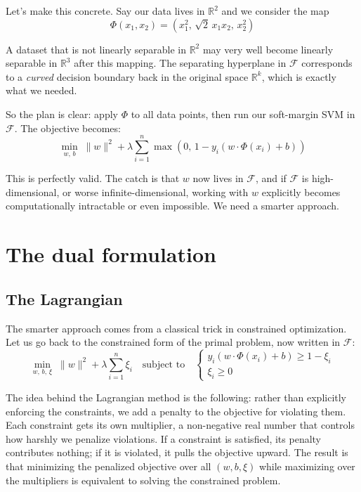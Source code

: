 \documentclass[12pt,a4paper]{article}
\begin{document}
Let's make this concrete. Say our data lives in $\mathbb{R}^2$ and we
consider the map
\[
\Phi(x_1, x_2) = (x_1^2,\, \sqrt{2}\, x_1 x_2,\, x_2^2)
\]

A dataset that is not linearly separable in $\mathbb{R}^2$ may very well
become linearly separable in $\mathbb{R}^3$ after this mapping. The
separating hyperplane in $\mathcal{F}$ corresponds to a \emph{curved}
decision boundary back in the original space $\mathbb{R}^k$, which is
exactly what we needed.

So the plan is clear: apply $\Phi$ to all data points, then run our
soft-margin SVM in $\mathcal{F}$. The objective becomes:
\[
\min_{w,\,b}\; \|w\|^2 + \lambda \sum_{i=1}^{n}
\max\!\left(0,\, 1 - y_i(w \cdot \Phi(x_i) + b)\right)
\]

This is perfectly valid. The catch is that $w$ now lives in $\mathcal{F}$,
and if $\mathcal{F}$ is high-dimensional, or worse infinite-dimensional,
working with $w$ explicitly becomes computationally intractable or even
impossible. We need a smarter approach.

\newpage

\section{The dual formulation}

\subsection{The Lagrangian}

The smarter approach comes from a classical trick in constrained
optimization. Let us go back to the constrained form of the primal problem,
now written in $\mathcal{F}$:
\[
\min_{w,\,b,\,\xi}\; \|w\|^2 + \lambda\sum_{i=1}^n \xi_i
\quad \text{subject to} \quad
\begin{cases}
y_i(w \cdot \Phi(x_i) + b) \geq 1 - \xi_i \\
\xi_i \geq 0
\end{cases}
\]

The idea behind the Lagrangian method is the following: rather than
explicitly enforcing the constraints, we add a penalty to the objective
for violating them. Each constraint gets its own multiplier, a non-negative
real number that controls how harshly we penalize violations. If a constraint
is satisfied, its penalty contributes nothing; if it is violated, it pulls
the objective upward. The result is that minimizing the penalized objective
over all $(w, b, \xi)$ while maximizing over the multipliers is equivalent
to solving the constrained problem.
\end{document}
